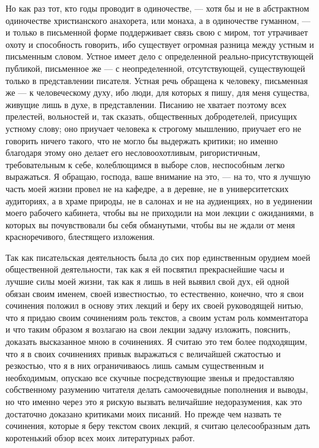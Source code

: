 \documentclass[12pt]{article}
\begin{document}
Но как раз тот, кто годы проводит в одиночестве, --- хотя бы и не в абстрактном одиночестве христианского анахорета, или монаха, а в одиночестве гуманном, --- и только в письменной форме поддерживает связь свою с миром, тот утрачивает охоту и способность говорить, ибо существует огромная разница между устным и письменным словом. Устное имеет дело с определенной реально-присутствующей публикой, письменное же --- с неопределенной, отсутствующей, существующей только в представлении писателя. Устная речь обращена к человеку, письменная же --- к человеческому духу, ибо люди, для которых я пишу, для меня существа, живущие лишь в духе, в представлении. Писанию не хватает поэтому всех прелестей, вольностей и, так сказать, общественных добродетелей, присущих устному слову; оно приучает человека к строгому мышлению, приучает его не говорить ничего такого, что не могло бы выдержать критики; но именно благодаря этому оно делает его несловоохотливым, ригористичным, требовательным к себе, колеблющимся в выборе слов, неспособным легко выражаться. Я обращаю, господа, ваше внимание на это, --- на то, что я лучшую часть моей жизни провел не на кафедре, а в деревне, не в университетских аудиториях, а в храме природы, не в салонах и не на аудиенциях, но в уединении моего рабочего кабинета, чтобы вы не приходили на мои лекции с ожиданиями, в которых вы почувствовали бы себя обманутыми, чтобы вы не ждали от меня красноречивого, блестящего изложения. 

Так как писательская деятельность была до сих пор единственным орудием моей общественной деятельности, так как я ей посвятил прекраснейшие часы и лучшие силы моей жизни, так как я лишь в ней выявил свой дух, ей одной обязан своим именем, своей известностью, то естественно, конечно, что я свои сочинения положил в основу этих лекций и беру их своей руководящей нитью, что я придаю своим сочинениям роль текстов, а своим устам роль комментатора и что таким образом я возлагаю на свои лекции задачу изложить, пояснить, доказать высказанное мною в сочинениях. Я считаю это тем более подходящим, что я в своих сочинениях привык выражаться с величайшей сжатостью и резкостью, что я в них ограничиваюсь лишь самым существенным и необходимым, опускаю все скучные посредствующие звенья и предоставляю собственному разумению читателя делать самоочевидные пополнения и выводы, но что именно через это я рискую вызвать величайшие недоразумения, как это достаточно доказано критиками моих писаний. Но прежде чем назвать те сочинения, которые я беру текстом своих лекций, я считаю целесообразным дать коротенький обзор всех моих литературных работ. 
\end{document}
